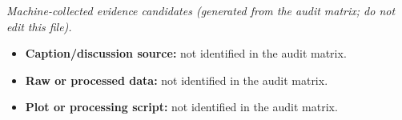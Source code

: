 \emph{Machine-collected evidence candidates (generated from the audit matrix; do not edit this file).}
\begin{itemize}[leftmargin=1.4em,noitemsep]
\item \textbf{Caption/discussion source:} not identified in the audit matrix.
\item \textbf{Raw or processed data:} not identified in the audit matrix.
\item \textbf{Plot or processing script:} not identified in the audit matrix.
\end{itemize}
